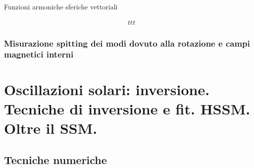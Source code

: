 \documentclass[../main.tex]{subfiles}
\begin{document}
\begin{refsection}
\begin{definition}{Funzioni armoniche sferiche vettoriali}

\begin{align*}
&ttt
\end{align*}

\end{definition}

\renewcommand{\footrefs}{{}}

\subsection{Misurazione spitting dei modi dovuto alla rotazione e campi magnetici interni}


\end{refsection}


{\let\clearpage\relax
\chapter{Oscillazioni solari: inversione. Tecniche di inversione e fit. HSSM. Oltre il SSM.}}
\PartialToc

\begin{refsection}


\section{Tecniche numeriche}


\end{refsection}
\end{document}
